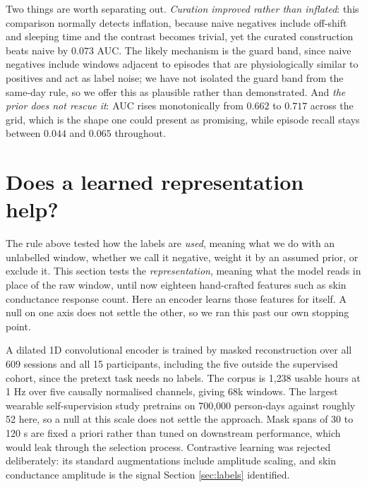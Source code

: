 \documentclass{article}
\begin{document}
Two things are worth separating out. \emph{Curation improved rather than
inflated}: this comparison normally detects inflation, because naive negatives
include off-shift and sleeping time and the contrast becomes trivial, yet the
curated construction beats naive by $0.073$ AUC. The likely mechanism is the
guard band, since naive negatives include windows adjacent to episodes that are
physiologically similar to positives and act as label noise; we have not
isolated the guard band from the same-day rule, so we offer this as plausible
rather than demonstrated. And \emph{the prior does not rescue it}: AUC rises
monotonically from $0.662$ to $0.717$ across the grid, which is the shape one
could present as promising, while episode recall stays between $0.044$ and
$0.065$ throughout.

\section{Does a learned representation help?}
\label{sec:ssl}

The rule above tested how the labels are \emph{used}, meaning what we do with
an unlabelled window, whether we call it negative, weight it by an assumed
prior, or exclude it. This section tests the \emph{representation}, meaning what
the model reads in place of the raw window, until now eighteen hand-crafted
features such as skin conductance response count. Here an
encoder learns those features for itself. A null on one axis does not settle
the other, so we ran this past our own stopping point.

A dilated 1D convolutional encoder is trained by masked reconstruction \cite{haresamudram2020} over all
609 sessions and all 15 participants, including the five outside the supervised
cohort, since the pretext task needs no labels. The corpus is 1{,}238 usable
hours at 1 Hz over five causally normalised channels, giving 68k windows. The largest wearable self-supervision study pretrains on 700{,}000
person-days \cite{yuan2024} against roughly 52 here, so a null at this scale
does not settle the approach. Mask
spans of 30 to 120 s are fixed a priori rather than tuned on downstream
performance, which would leak through the selection process. Contrastive
learning was rejected deliberately: its standard augmentations include
amplitude scaling, and skin conductance amplitude is the signal Section
\ref{sec:labels} identified.
\end{document}
